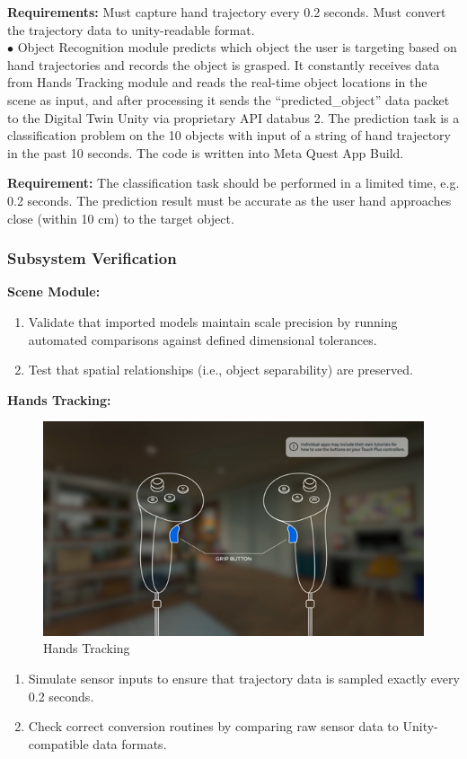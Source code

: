 \documentclass{senior-design}
\begin{document}
 

\textbf{Requirements:} Must capture hand trajectory every 0.2 seconds. Must convert the trajectory data to unity-readable format.
\\
 

$\bullet$ Object Recognition module predicts which object the user is targeting based on hand trajectories and records the object is grasped. It constantly receives data from Hands Tracking module and reads the real-time object locations in the scene as input, and after processing it sends the “predicted\_object” data packet to the Digital Twin Unity via proprietary API databus 2. The prediction task is a classification problem on the 10 objects with input of a string of hand trajectory in the past 10 seconds. The code is written into Meta Quest App Build. 

 

\textbf{Requirement:} The classification task should be performed in a limited time, e.g. 0.2 seconds. The prediction result must be accurate as the user hand approaches close (within 10 cm) to the target object.  

 
\subsubsection*{Subsystem Verification}
\textbf{Scene Module:} 
\begin{enumerate}
    \item Validate that imported models maintain scale precision by running automated comparisons against defined dimensional tolerances. 
    \item Test that spatial relationships (i.e., object separability) are preserved. 
\end{enumerate}
 
\textbf{Hands Tracking:} 
\begin{figure}[H]
    \centering
    \includegraphics[width=0.6\linewidth]{Hands Tracking.png}
    \caption{Hands Tracking}
\end{figure}
\begin{enumerate}
    \item Simulate sensor inputs to ensure that trajectory data is sampled exactly every 0.2 seconds\cite{Gichane2024}. 
    \item Check correct conversion routines by comparing raw sensor data to Unity-compatible data formats. 
\end{enumerate}
 
\end{document}
